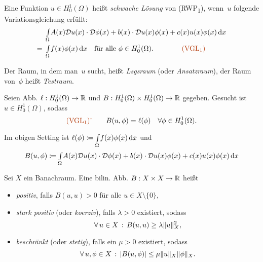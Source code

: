 \documentclass{cheat-sheet}
\newcommand{\IntOmega}[2]{\AInt{\Omega}{#1}{#2}} %
\newcommand{\tss}[1]{\textsubscript{#1}} %
\newcommand{\DO}{\mathcal{D}} %
\newcommand{\probl}[1]{\textcolor{ProblemColor}{#1}}
\begin{document}

\begin{defn}
  Eine Funktion $u \in H_0^1(\Omega)$ heißt \emph{schwache Lösung} von (RWP\tss{1}), wenn~$u$ folgende Variationsgleichung erfüllt:
  \begin{align*}
    & \IntOmega{A(x) \DO u(x) \cdot \DO \phi(x) + b(x) \cdot \DO u(x) \phi(x) + c(x) u(x) \phi(x)}{x} \\
    = \enspace & \IntOmega{f(x) \phi(x)}{x}
    \quad \text{für alle } \phi \in H_0^1(\Omega).
    \qquad \qquad \text{\probl{(VGL\tss{1})}}
  \end{align*}
\end{defn}

\begin{sprechweise}
  Der Raum, in dem man~$u$ sucht, heißt \emph{Lsgsraum} (oder \textit{Ansatzraum}), der Raum von~$\phi$ heißt \emph{Testraum}.
\end{sprechweise}


\begin{prob}
  Seien Abb. $\ell : H_0^1(\Omega) \to \mathbb{R}$ und $B : H_0^1(\Omega) \times H_0^1(\Omega) \to \mathbb{R}$ gegeben.
  Gesucht ist $u \in H_0^1(\Omega)$, sodass
  \[
    \text{\probl{(VGL\tss{1})'}} \qquad
    B(u, \phi) = \ell(\phi) \quad
    \forall \phi \in H_0^1(\Omega).
  \]
\end{prob}

\begin{bem}
  Im obigen Setting ist \enspace
  $\ell(\phi) \coloneqq \IntOmega{f(x) \phi(x)}{x}$ \enspace
  und
  \[
    B(u, \phi) \coloneqq \IntOmega{A(x) \DO u(x) \cdot \DO \phi(x) + b(x) \cdot \DO u(x) \phi(x) + c(x) u(x) \phi(x)}{x}
  \]
\end{bem}

\begin{defn}
  Sei $X$ ein Banachraum.
  Eine bilin. Abb. $B : X \times X \to \mathbb{R}$ heißt
  \begin{itemize}
    \item \emph{positiv}, falls $B(u, u) > 0$ für alle $u \in X \setminus \{ 0 \}$,
    \item \emph{stark positiv} (oder \emph{koerziv}), falls $\lambda > 0$ existiert, sodass
    \[ \forall \, {u \in X} \,:\, B(u, u) \geq \lambda \lVert u\rVert_X^2, \]
    \item \emph{beschränkt} (oder \textit{stetig}), falls ein $\mu > 0$ existiert, sodass
    \[ \forall \, {u, \phi \in X} \,:\, \lvert B(u, \phi)\rvert \leq \mu \lVert u\rVert_X \lVert\phi\rVert_X. \]
  \end{itemize}
\end{defn}
\end{document}
